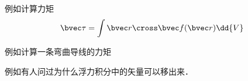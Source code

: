 
例如计算力矩
\begin{equation}
\bvec \tau = \int \bvec r \cross \bvec f(\bvec r) \dd{V}
\end{equation}

例如计算一条弯曲导线的力矩

例如有人问过为什么浮力积分中的矢量可以移出来．
